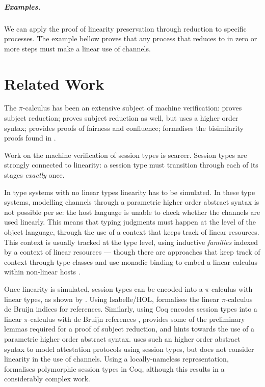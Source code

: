 \documentclass{mproj}
\newcommand{\picalc}{$\pi$-calculus}
\begin{document}


\paragraph{Examples.}
We can apply the proof of linearity preservation through reduction to specific processes. The example bellow proves that any process that  reduces to in zero or more steps must make a linear use of channels.


\chapter{Related Work}\label{related-work}

The \picalc{} has been an extensive subject of machine verification: \cite{Henry-Gerard1999} proves subject reduction; \cite{Despeyroux2000} proves subject reduction as well, but uses a higher order syntax; \cite{Affeldt2008} provides proofs of fairness and confluence; \cite{Honsell2001} formalises the bisimilarity proofs found in \cite{Walker1989}.

Work on the machine verification of session types is scarcer.  Session types are strongly connected to linearity: a session type must transition through each of its stages \emph{exactly} once.

In type systems with no linear types linearity has to be simulated. In these type systems, modelling channels through a parametric higher order abstract syntax \cite{Chlipala2008} is not possible per se: the host language is unable to check whether the channels are used linearly. This means that typing judgments must happen at the level of the object language, through the use of a context that keeps track of linear resources.  This context is usually tracked at the type level, using inductive \emph{families} \cite{Dybjer1994} indexed by a context of linear resources \cite{Power2000} --- though there are approaches that keep track of context through type-classes and use monadic binding to embed a linear calculus within non-linear hosts \cite{Paykin2017}. 

Once linearity is simulated, session types can be encoded into a \picalc{} with linear types, as shown by \cite{Kobayashi1996,Dardha2012,Dardha2017}. Using Isabelle/HOL, \cite{Gay2001} formalises the linear \picalc{} de Bruijn indices \cite{deBruijn1972} for references. Similarly, using Coq \cite{Dilmore2019} encodes session types into a linear \picalc{} with de Bruijn references , provides some of the preliminary lemmas required for a proof of subject reduction, and hints towards the use of a parametric higher order abstract syntax. \cite{Petz} uses such an higher order abstract syntax to model attestation protocols using session types, but does not consider linearity in the use of channels. Using a locally-nameless \cite{Chargueraud2012} representation, \cite{Goto2016} formalises polymorphic session types in Coq, although this results in a considerably complex work.
\end{document}
